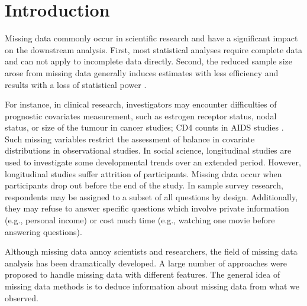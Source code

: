 \chapter{Introduction} 
\label{chap1}
	Missing data commonly occur in scientific research and have a significant impact on the downstream analysis. First, most statistical analyses require complete data and can not apply to incomplete data directly. Second, the reduced sample size arose from missing data generally induces estimates with less efficiency and results with a loss of statistical power \citep{RubinD1987}.

For instance, in clinical research, investigators may encounter difficulties of prognostic covariates measurement, such as estrogen receptor status, nodal status, or size of the tumour in cancer studies; CD4 counts in AIDS studies \citep{ibrahim2012missing}. Such missing variables restrict the assessment of balance in covariate distributions in observational studies. In social science, longitudinal studies are used to investigate some developmental trends over an extended period. However, longitudinal studies suffer attrition of participants. Missing data occur when participants drop out before the end of the study. In sample survey research, respondents may be assigned to a subset of all questions by design. Additionally, they may refuse to answer specific questions which involve private information (e.g., personal income) or cost much time (e.g., watching one movie before answering questions).  

Although missing data annoy scientists and researchers, the field of missing data analysis has been dramatically developed. A large number of approaches were proposed to handle missing data with different features. The general idea of missing data methods is to deduce information about missing data from what we observed.

